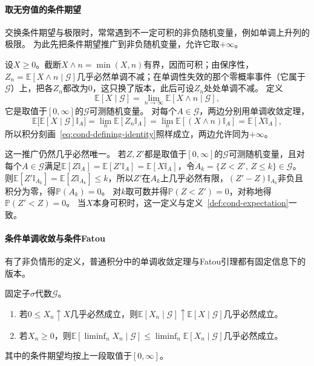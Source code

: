 \paragraph{取无穷值的条件期望}
交换条件期望与极限时，常常遇到不一定可积的非负随机变量，例如单调上升列的极限。
为此先把条件期望推广到非负随机变量，允许它取$+\infty$。

设$X\geq0$。截断$X\wedge n=\min(X,n)$有界，因而可积；由保序性，$Z_n=\mathbb E[X\wedge n\mid\mathcal G]$几乎必然单调不减；在单调性失效的那个零概率事件（它属于$\mathcal G$）上，把各$Z_n$都改为$0$，这只换了版本，此后可设$Z_n$处处单调不减。
定义
\[
  \mathbb E[X\mid\mathcal G]=\lim_{n\to\infty}\mathbb E[X\wedge n\mid\mathcal G],
\]
它是取值于$[0,\infty]$的$\mathcal G$可测随机变量。
对每个$A\in\mathcal G$，两边分别用单调收敛定理，
\[
  \mathbb E\bigl[\mathbb E[X\mid\mathcal G]\mathbb I_A\bigr]=\lim_n\mathbb E[Z_n\mathbb I_A]=\lim_n\mathbb E[(X\wedge n)\mathbb I_A]=\mathbb E[X\mathbb I_A],
\]
所以积分刻画~\eqref{eq:cond-defining-identity}照样成立，两边允许同为$+\infty$。

这一推广仍然几乎必然唯一。
若$Z,Z'$都是取值于$[0,\infty]$的$\mathcal G$可测随机变量，且对每个$A\in\mathcal G$满足$\mathbb E[Z\mathbb I_A]=\mathbb E[Z'\mathbb I_A]=\mathbb E[X\mathbb I_A]$，令$A_k=\{Z<Z',\,Z\leq k\}\in\mathcal G$。
则$\mathbb E[Z'\mathbb I_{A_k}]=\mathbb E[Z\mathbb I_{A_k}]\leq k$，所以$Z'$在$A_k$上几乎必然有限，$(Z'-Z)\mathbb I_{A_k}$非负且积分为零，得$\mathbb P(A_k)=0$。
对$k$取可数并得$\mathbb P(Z<Z')=0$，对称地得$\mathbb P(Z'<Z)=0$。
当$X$本身可积时，这一定义与定义~\ref{def:cond-expectation}一致。

\paragraph{条件单调收敛与条件Fatou}
有了非负情形的定义，普通积分中的单调收敛定理与Fatou引理都有固定信息下的版本。

\begin{theorem}[条件单调收敛定理与条件Fatou引理]
\label{thm:cond-monotone}
固定子$\sigma$代数$\mathcal G$。
\begin{enumerate}
  \item 若$0\leq X_n\uparrow X$几乎必然成立，则$\mathbb E[X_n\mid\mathcal G]\uparrow\mathbb E[X\mid\mathcal G]$几乎必然成立。
  \item 若$X_n\geq0$，则$\mathbb E[\liminf_nX_n\mid\mathcal G]\leq\liminf_n\mathbb E[X_n\mid\mathcal G]$几乎必然成立。
\end{enumerate}
其中的条件期望均按上一段取值于$[0,\infty]$。
\end{theorem}

